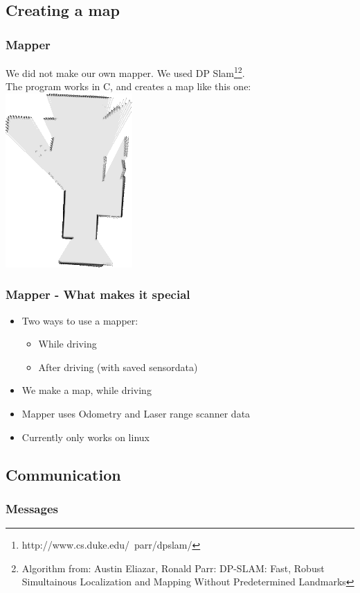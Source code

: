 \documentclass{beamer}
\begin{document}
\subsection{Creating a map}
\begin{frame}
\frametitle{Mapper}
We did not make our own mapper. We used DP
Slam\footnote{http://www.cs.duke.edu/~parr/dpslam/}\footnote{Algorithm from: Austin Eliazar,
Ronald Parr: DP-SLAM: Fast, Robust Simultainous Localization and Mapping Without
Predetermined Landmarks}.\\
The program works in C, and creates a map like this one:
\includegraphics[height=.5\textheight]{FirstHighMap}
\end{frame}

\begin{frame}
\frametitle{Mapper - What makes it special}
\begin{itemize}
    \item Two ways to use a mapper:
    \begin{itemize}
        \item While driving
        \item After driving (with saved sensordata)
    \end{itemize}
    \item We make a map, while driving
    \item Mapper uses Odometry and Laser range scanner data
    \item Currently only works on linux
    \end{itemize}
\end{frame}

\subsection{Communication}
\begin{frame}
\frametitle{Messages}
\end{frame}
\end{document}
